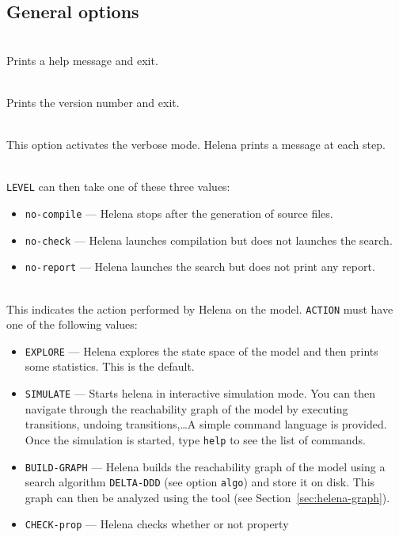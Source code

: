 \subsection{General options}
\begin{description}
\item{}\\ Prints a help message and exit.
\item{}\\ Prints the version number and exit.
\item{}\\ This option activates the verbose
  mode.  Helena prints a message at each step.
\item{}\\ \texttt{LEVEL} can then take
  one of these three values:
  \begin{itemize}
  \item \texttt{no-compile} --- Helena stops after the generation of
    source files.
  \item \texttt{no-check} --- Helena launches compilation but does not
    launches the search.
  \item \texttt{no-report} --- Helena launches the search but does not
    print any report.
  \end{itemize}
\item{}\\
  This indicates the action performed by Helena on the model.
  \texttt{ACTION} must have one of the following values:
  \begin{itemize}
  \item\texttt{EXPLORE} --- Helena explores the state space of the
    model and then prints some statistics.  This is the default.
  \item\texttt{SIMULATE} --- Starts helena in interactive simulation
    mode.  You can then navigate through the reachability graph of the
    model by executing transitions, undoing transitions,\ldots A
    simple command language is provided.  Once the simulation is
    started, type \texttt{help} to see the list of commands.
  \item\texttt{BUILD-GRAPH} --- Helena builds the reachability graph
    of the model using a search algorithm \texttt{DELTA-DDD} (see
    option \texttt{algo}) and store it on disk.  This graph can then
    be analyzed using the  tool (see
    Section~\ref{sec:helena-graph}).
  \item\texttt{CHECK-prop} --- Helena checks whether or not property

\end{itemize}
\end{description}
